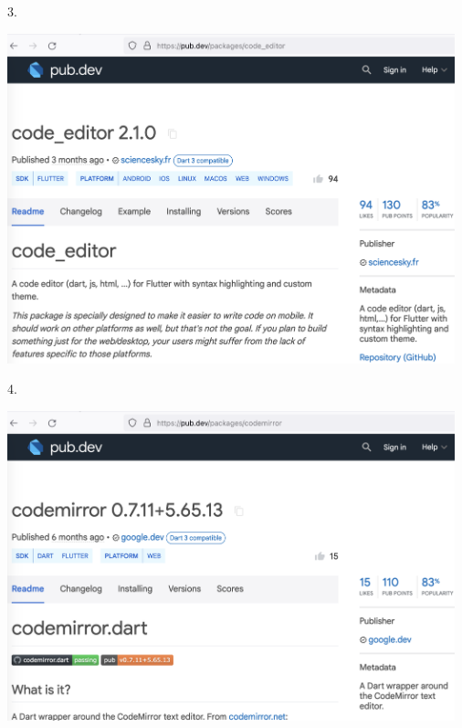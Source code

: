 3.

\begin{center}
    \includegraphics[width=35em]{code_editor}
\end{center}
\pagebreak

4.

\begin{center}
    \includegraphics[width=35em]{codemirror}
\end{center}
\pagebreak
